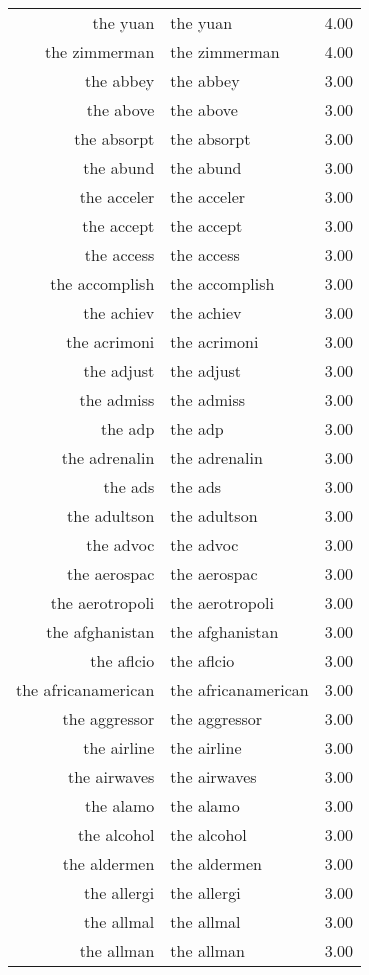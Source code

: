 \begin{table}[ht]
\begin{tabular}{rlr}
  the yuan & the yuan & 4.00 \\ 
  the zimmerman & the zimmerman & 4.00 \\ 
  the abbey & the abbey & 3.00 \\ 
  the above & the above & 3.00 \\ 
  the absorpt & the absorpt & 3.00 \\ 
  the abund & the abund & 3.00 \\ 
  the acceler & the acceler & 3.00 \\ 
  the accept & the accept & 3.00 \\ 
  the access & the access & 3.00 \\ 
  the accomplish & the accomplish & 3.00 \\ 
  the achiev & the achiev & 3.00 \\ 
  the acrimoni & the acrimoni & 3.00 \\ 
  the adjust & the adjust & 3.00 \\ 
  the admiss & the admiss & 3.00 \\ 
  the adp & the adp & 3.00 \\ 
  the adrenalin & the adrenalin & 3.00 \\ 
  the ads & the ads & 3.00 \\ 
  the adultson & the adultson & 3.00 \\ 
  the advoc & the advoc & 3.00 \\ 
  the aerospac & the aerospac & 3.00 \\ 
  the aerotropoli & the aerotropoli & 3.00 \\ 
  the afghanistan & the afghanistan & 3.00 \\ 
  the aflcio & the aflcio & 3.00 \\ 
  the africanamerican & the africanamerican & 3.00 \\ 
  the aggressor & the aggressor & 3.00 \\ 
  the airline & the airline & 3.00 \\ 
  the airwaves & the airwaves & 3.00 \\ 
  the alamo & the alamo & 3.00 \\ 
  the alcohol & the alcohol & 3.00 \\ 
  the aldermen & the aldermen & 3.00 \\ 
  the allergi & the allergi & 3.00 \\ 
  the allmal & the allmal & 3.00 \\ 
  the allman & the allman & 3.00 \\ 

\end{tabular}
\end{table}
